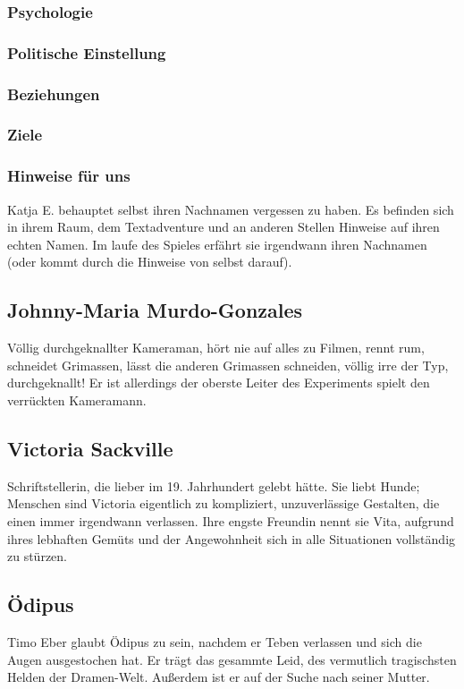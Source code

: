 \documentclass[12pt, a4paper, openany]{report}
\begin{document}
\subsubsection{Psychologie}
\subsubsection{Politische Einstellung}
\subsubsection{Beziehungen}
\subsubsection{Ziele}
\subsubsection{Hinweise für uns}
Katja E. behauptet selbst ihren Nachnamen vergessen zu haben. 
Es befinden sich in ihrem Raum, dem Textadventure und an anderen Stellen Hinweise auf ihren echten Namen. 
Im laufe des Spieles erfährt sie irgendwann ihren Nachnamen (oder kommt durch die Hinweise von selbst darauf). 

\subsection{Johnny-Maria Murdo-Gonzales}
Völlig durchgeknallter Kameraman, hört nie auf alles zu Filmen, rennt rum, schneidet Grimassen, lässt die anderen Grimassen schneiden, völlig irre der Typ, durchgeknallt! 
Er ist allerdings der oberste Leiter des Experiments \glqq spielt\grqq{} den verrückten Kameramann. 

\subsection{Victoria Sackville}
Schriftstellerin, die lieber im 19. Jahrhundert gelebt hätte. Sie liebt Hunde; Menschen sind Victoria eigentlich zu kompliziert, unzuverlässige Gestalten, die einen immer irgendwann verlassen. Ihre engste Freundin nennt sie Vita, aufgrund ihres lebhaften Gemüts und der Angewohnheit sich in alle Situationen vollständig zu stürzen.

\subsection{Ödipus}
Timo Eber glaubt Ödipus zu sein, nachdem er Teben verlassen und sich die Augen ausgestochen hat.
Er trägt das gesammte Leid, des vermutlich tragischsten Helden der Dramen-Welt.
Außerdem ist er auf der Suche nach seiner Mutter.
\end{document}
